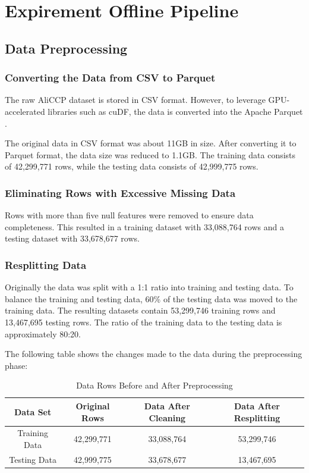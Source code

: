 \section{Expirement Offline Pipeline}

\subsection{Data Preprocessing}

\subsubsection{Converting the Data from CSV to Parquet}

The raw AliCCP dataset is stored in CSV format. However, to leverage GPU-accelerated libraries such as cuDF, the data is converted into the Apache Parquet \cite{ApacheParquet}.


The original data in CSV format was about 11GB in size. After converting it to Parquet format, the data size was reduced to 1.1GB.
The training data consists of 42,299,771 rows, while the testing data consists of 42,999,775 rows.

\subsubsection{Eliminating Rows with Excessive Missing Data}

Rows with more than five null features were removed to ensure data completeness.
This resulted in a training dataset with 33,088,764 rows and a testing dataset with 33,678,677 rows.

\subsubsection{Resplitting Data}

Originally the data was split with a 1:1 ratio into training and testing data.
To balance the training and testing data, 60\% of the testing data was moved to the training data. 
The resulting datasets contain 53,299,746 training rows and 13,467,695 testing rows.
The ratio of the training data to the testing data is approximately 80:20.


The following table shows the changes made to the data during the preprocessing phase:

\begin{table}[ht]
\centering
\begin{tabular}{|c|c|c|c|}
\hline
\textbf{Data Set} & \textbf{Original Rows} & \textbf{Data After Cleaning} & \textbf{Data After Resplitting} \\
\hline
Training Data & 42,299,771 & 33,088,764 & 53,299,746 \\
\hline
Testing Data & 42,999,775 & 33,678,677 & 13,467,695 \\
\hline
\end{tabular}
\caption{Data Rows Before and After Preprocessing}
\label{tab:data-reprocessing}
\end{table}

